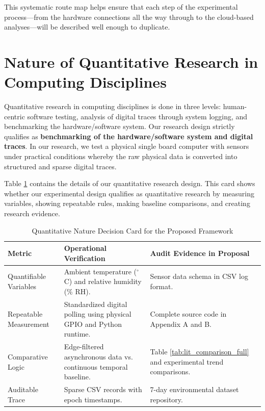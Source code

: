 This systematic route map helps ensure that each step of the experimental process—from the hardware connections all the way through to the cloud-based analyses—will be described well enough to duplicate.

\section{Nature of Quantitative Research in Computing Disciplines}
\label{sec:nature}
Quantitative research in computing disciplines is done in three levels: human-centric software testing, analysis of digital traces through system logging, and benchmarking the hardware/software system. Our research design strictly qualifies as \textbf{benchmarking of the hardware/software system and digital traces}. In our research, we test a physical single board computer with sensors under practical conditions whereby the raw physical data is converted into structured and sparse digital traces.

Table \ref{tab:nature_card} contains the details of our quantitative research design. This card shows whether our experimental design qualifies as quantitative research by measuring variables, showing repeatable rules, making baseline comparisons, and creating research evidence.

\begin{table}[htpb]
    \centering
    \caption{Quantitative Nature Decision Card for the Proposed Framework}
    \label{tab:nature_card}
    \begin{tabular}{@{}lp{5cm}p{6cm}@{}}
        \toprule
        \textbf{Metric} & \textbf{Operational Verification} & \textbf{Audit Evidence in Proposal} \\
        \midrule
        \addlinespace
        Quantifiable Variables & Ambient temperature ($^\circ$C) and relative humidity (\% RH). & Sensor data schema in CSV log format. \\
        \addlinespace
        Repeatable Measurement & Standardized digital polling using physical GPIO and Python runtime. & Complete source code in Appendix A and B. \\
        \addlinespace
        Comparative Logic & Edge-filtered asynchronous data vs. continuous temporal baseline. & Table \ref{tab:lit_comparison_full} and experimental trend comparisons. \\
        \addlinespace
        Auditable Trace & Sparse CSV records with epoch timestamps. & 7-day environmental dataset repository. \\
        \bottomrule
    \end{tabular}
\end{table}

